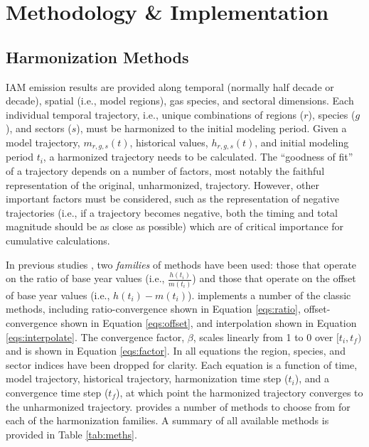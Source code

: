 \section{Methodology \& Implementation}\label{sec:meths}

\subsection{Harmonization Methods}

IAM emission results are provided along temporal (normally half decade or
decade), spatial (i.e., model regions), gas species, and sectoral
dimensions. Each individual temporal trajectory, i.e., unique combinations of
regions ($r$), species ($g$), and sectors ($s$), must be harmonized to the
initial modeling period. Given a model trajectory, $m_{r, g, s}(t)$, historical
values, $h_{r, g, s}(t)$, and initial modeling period $t_i$, a harmonized
trajectory needs to be calculated. The ``goodness of fit'' of a trajectory
depends on a number of factors, most notably the faithful representation of the
original, unharmonized, trajectory. However, other important factors must be
considered, such as the representation of negative trajectories (i.e., if a
trajectory becomes negative, both the timing and total magnitude should be as
close as possible) which are of critical importance for cumulative \cotwo
calculations.

In previous studies \cite{meinshausen_rcp_2011,rogelj_discrepancies_2011}, two
\textit{families} of methods have been used: those that operate on the ratio of
base year values (i.e., $\frac{h(t_i)}{m(t_i)}$) and those that operate on the
offset of base year values (i.e., $h(t_i) - m(t_i)$).  implements a
number of the classic methods, including ratio-convergence shown in Equation
\ref{eqs:ratio}, offset-convergence shown in Equation \ref{eqs:offset}, and
interpolation shown in Equation \ref{eqs:interpolate}. The convergence factor,
$\beta$, scales linearly from 1 to 0 over $[t_i, t_f)$ and is shown in Equation
  \ref{eqs:factor}. In all equations the region, species, and sector indices
  have been dropped for clarity. Each equation is a function of time, model
  trajectory, historical trajectory, harmonization time step ($t_i$), and a
  convergence time step ($t_f$), at which point the harmonized trajectory
  converges to the unharmonized trajectory.  provides a number of
  methods to choose from for each of the harmonization families. A summary of
  all available methods is provided in Table \ref{tab:meths}.


